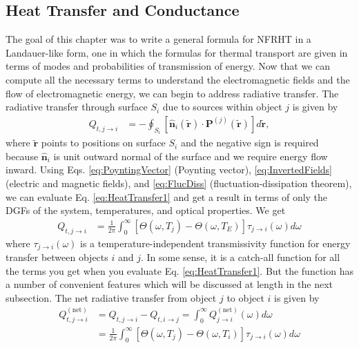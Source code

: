 \subsection{Heat Transfer and Conductance}
%
The goal of this chapter was to write a general formula for NFRHT in a Landauer-like form, one in which the formulas for thermal transport are given in terms of modes and probabilities of transmission of energy. Now that we can compute all the necessary terms to understand the electromagnetic fields and the flow of electromagnetic energy, we can begin to address radiative transfer. The radiative transfer through surface $S_{i}$ due to sources within object $j$ is given by
%
\begin{align}
Q_{t, j \rightarrow i} &= - \oint_{S_i} \left[ \widehat{\boldsymbol{n}}_{i}(\boldsymbol{\widetilde{r}}) \cdot \boldsymbol{P}^{(j)}(\boldsymbol{\widetilde{r}}) \right] d\boldsymbol{\widetilde{r}},
\label{eq:HeatTransfer1}
\end{align}
%
where $\boldsymbol{\widetilde{r}}$ points to positions on surface $S_{i}$ and the negative sign is required because $\widehat{\boldsymbol{n}}_{i}$ is unit outward normal of the surface and we require energy flow inward. Using Eqs. \ref{eq:PoyntingVector} (Poynting vector), \ref{eq:InvertedFields} (electric and magnetic fields), and \ref{eq:FlucDiss} (fluctuation-dissipation theorem), we can evaluate Eq. \ref{eq:HeatTransfer1} and get a result in terms of only the DGFs of the system, temperatures, and optical properties. We get
%
\begin{align}
Q_{t, j \rightarrow i} &= \frac{1}{2\pi} \int_{0}^{\infty} \left[ \Theta(\omega, T_{j}) - \Theta(\omega, T_{E}) \right] \tau_{j \rightarrow i}(\omega) d\omega
\label{eq:HeatTransfer2}
\end{align}
%
where $\tau_{j \rightarrow i}(\omega)$ is a temperature-independent transmissivity function for energy transfer between objects $i$ and $j$. In some sense, it is a catch-all function for all the terms you get when you evaluate Eq. \ref{eq:HeatTransfer1}. But the function has a number of convenient features which will be discussed at length in the next subsection. The net radiative transfer from object $j$ to object $i$ is given by
%
\begin{equation}
\begin{split}
Q_{t, j \rightarrow i}^{(\mathrm{net})} &= Q_{t, j \rightarrow i} - Q_{t, i \rightarrow j} = \int_{0}^{\infty} Q_{j \rightarrow i}^{(\mathrm{net})}(\omega) d\omega
\\
&= \frac{1}{2\pi} \int_{0}^{\infty} \left[ \Theta(\omega, T_{j}) - \Theta(\omega, T_{i}) \right] \tau_{j \rightarrow i}(\omega) d\omega
\label{eq:NetHeatTransfer}
\end{split}
\end{equation}

